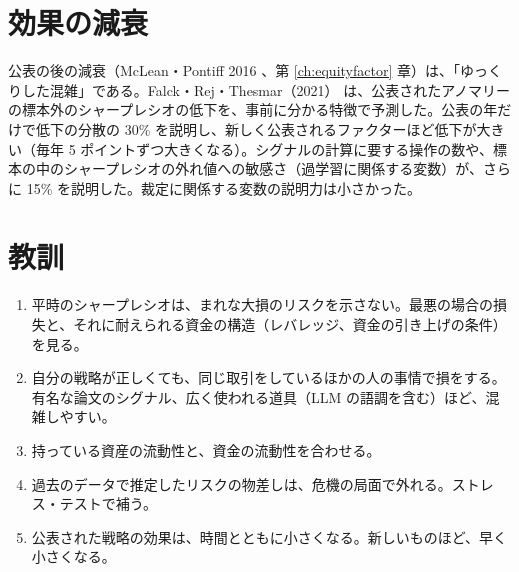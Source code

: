 \section{効果の減衰}

公表の後の減衰（McLean・Pontiff 2016 \cite{mcleanpontiff2016}、第 \ref{ch:equityfactor} 章）は、「ゆっくりした混雑」である。Falck・Rej・Thesmar（2021）\cite{falck2022} は、公表されたアノマリーの標本外のシャープレシオの低下を、事前に分かる特徴で予測した。公表の年だけで低下の分散の 30\% を説明し、新しく公表されるファクターほど低下が大きい（毎年 5 ポイントずつ大きくなる）。シグナルの計算に要する操作の数や、標本の中のシャープレシオの外れ値への敏感さ（過学習に関係する変数）が、さらに 15\% を説明した。裁定に関係する変数の説明力は小さかった。

\section{教訓}

\begin{keybox}[失敗の研究から分かること]
\begin{enumerate}
\item 平時のシャープレシオは、まれな大損のリスクを示さない。最悪の場合の損失と、それに耐えられる資金の構造（レバレッジ、資金の引き上げの条件）を見る。
\item 自分の戦略が正しくても、同じ取引をしているほかの人の事情で損をする。有名な論文のシグナル、広く使われる道具（LLM の語調を含む）ほど、混雑しやすい。
\item 持っている資産の流動性と、資金の流動性を合わせる。
\item 過去のデータで推定したリスクの物差しは、危機の局面で外れる。ストレス・テストで補う。
\item 公表された戦略の効果は、時間とともに小さくなる。新しいものほど、早く小さくなる。
\end{enumerate}
\end{keybox}
